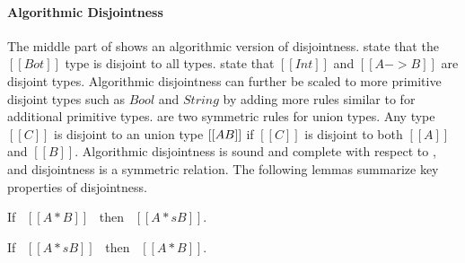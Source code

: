 \paragraph{Algorithmic Disjointness}
The middle part of  shows an algorithmic
version of disjointness.   state that the $[[Bot]]$
type is disjoint to all types.   state that
$[[Int]]$ and $[[A -> B]]$ are disjoint types.  Algorithmic
disjointness can further be scaled to more primitive disjoint types
such as $Bool$ and $String$ by adding more rules similar to
 for additional primitive types.   are two symmetric rules for union types. Any type $[[C]]$ is
disjoint to an union type $[[A \/ B]]$ if $[[C]]$ is disjoint to both
$[[A]]$ and $[[B]]$.  Algorithmic disjointness is sound and complete
with respect to , and disjointness is a symmetric
relation. The following lemmas summarize key properties of disjointness.

\begin{lemma}
  If \ $[[A * B]]$ \ then \ $[[A *s B]]$.
\label{lemma:union:disj-sound}
\end{lemma}

\begin{comment}
\begin{proof}
  By induction on algorithmic disjointness relation.
  \begin{itemize}
    \item Cases \rref{ad-btmr, ad-btml, ad-orl, ad-orr} require induction on hypothesis
          and \Cref{lemma:union:sub-or}.
    \item Cases \rref{ad-intl, ad-intr} require induction on type and \Cref{lemma:union:sub-or}.
  \end{itemize}
\end{proof}
\end{comment}

\begin{lemma}
  If \ $[[A *s B]]$ \ then \ $[[A * B]]$.
\label{lemma:union:disj-complete}
\end{lemma}

